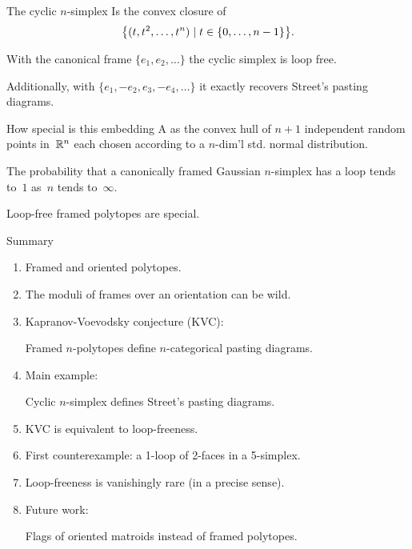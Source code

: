 \begin{frame}{The cyclic $n$-simplex}
	\pause
	Is the convex closure of
	\[
	\set[\big]{(t,t^2,\dots,t^n) \mid t \in \{0,\dots,n-1\}}.
	\]

	\pause

	\smallskip
	With the canonical frame $\{e_1,e_2,\dots\}$ the cyclic simplex is loop free.

	\pause\smallskip
	Additionally, with $\{e_1,-e_2,e_3,-e_4,\dots\}$ it exactly recovers Street's pasting diagrams.
\end{frame}

\begin{frame}{How special is this embedding}
	\pause
	A  as the convex hull of $n+1$ independent random points in~$\R^n$ each chosen according to a $n$-dim'l std. normal distribution.

	\pause\medskip
	 The probability that a canonically framed Gaussian $n$-simplex has a loop tends to~$1$ as~$n$ tends to~$\infty$.

	\pause\medskip
	 Loop-free framed polytopes are special.
\end{frame}

\begin{frame}{Summary}
	\pause
	\begin{enumerate}
		\item\pause Framed and oriented polytopes.
		\item\pause The moduli of frames over an orientation can be wild.
		\item\pause Kapranov-Voevodsky conjecture (KVC):

		\smallskip
		Framed $n$-polytopes define $n$-categorical pasting diagrams.

		\item\pause Main example:

		\smallskip
		Cyclic $n$-simplex defines Street's pasting diagrams.

		\item\pause KVC is equivalent to loop-freeness.

		\item\pause First counterexample: a 1-loop of 2-faces in a 5-simplex.

		\item\pause Loop-freeness is vanishingly rare (in a precise sense).

		\item\pause Future work:

		\smallskip
		Flags of oriented matroids instead of framed polytopes.
	\end{enumerate}
\end{frame}

